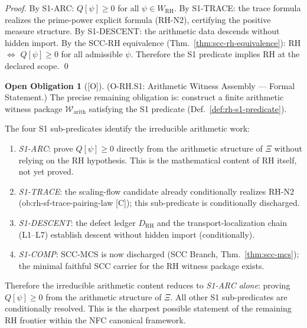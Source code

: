 \documentclass[12pt,oneside]{amsbook}
\theoremstyle{plain}
\theoremstyle{definition}
\newtheorem{obligation}[theorem]{Open Obligation}
\theoremstyle{remark}
\newcommand{\status}[1]{\textup{[#1]}}
\begin{document}
\begin{proof}
By S1-ARC: $Q[\psi]\ge0$ for all $\psi\in W_{\mathrm{RH}}$.
By S1-TRACE: the trace formula realizes the prime-power explicit
formula (RH-N2), certifying the positive measure structure.
By S1-DESCENT: the arithmetic data descends without hidden import.
By the SCC-RH equivalence (Thm.~\ref{thm:scc-rh-equivalence}):
RH $\Leftrightarrow$ $Q[\psi]\ge0$ for all admissible $\psi$.
Therefore the S1 predicate implies RH at the declared scope.
\qed
\end{proof}

\begin{obligation}[\status{O}]\label{ob:rh-s1-formal}
\textup{(O-RH.S1: Arithmetic Witness Assembly --- Formal Statement.)}
The precise remaining obligation is: construct a finite arithmetic
witness package $\mathcal{W}_{\mathrm{arith}}$ satisfying the S1
predicate (Def.~\ref{def:rh-s1-predicate}).

The four S1 sub-predicates identify the irreducible arithmetic work:
\begin{enumerate}[label=\textup{(\arabic*)}]
 \item \emph{S1-ARC}: prove $Q[\psi]\ge0$ directly from the
 arithmetic structure of $\Xi$ without relying on the RH hypothesis.
 This is the mathematical content of RH itself, not yet proved.
 \item \emph{S1-TRACE}: the scaling-flow candidate already
 conditionally realizes RH-N2 (ob:rh-sf-trace-pairing-law [C]);
 this sub-predicate is conditionally discharged.
 \item \emph{S1-DESCENT}: the defect ledger $D_{\mathrm{RH}}$ and
 the transport-localization chain (L1--L7) establish descent
 without hidden import (conditionally).
 \item \emph{S1-COMP}: SCC-MCS is now discharged (SCC Branch,
 Thm.~\ref{thm:scc-mcs}); the minimal faithful SCC carrier for
 the RH witness package exists.
\end{enumerate}
Therefore the irreducible arithmetic content reduces to
\emph{S1-ARC alone}: proving $Q[\psi]\ge0$ from the arithmetic
structure of $\Xi$. All other S1 sub-predicates are conditionally
resolved. This is the sharpest possible statement of the
remaining RH frontier within the NFC canonical framework.
\end{obligation}
\end{document}
